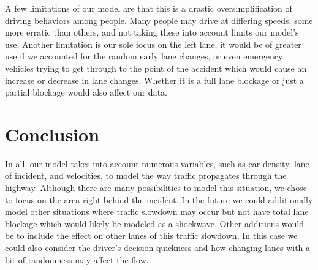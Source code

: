 \documentclass[10pt]{article}
\begin{document}
A few limitations of our model are that this is a drastic oversimplification of driving behaviors among people. Many people may drive at differing speeds, some more erratic than others, and not taking these into account limits our model’s use. Another limitation is our sole focus on the left lane, it would be of greater use if we accounted for the random early lane changes, or even emergency vehicles trying to get through to the point of the accident which would cause an increase or decrease in lane changes. Whether it is a full lane blockage or just a partial blockage would also affect our data.  

\section*{Conclusion}
In all, our model takes into account numerous variables, such as car density, lane of incident, and velocities, to model the way traffic propagates through the highway. Although there are many possibilities to model this situation, we chose to focus on the area right behind the incident. In the future we could additionally model other situations where traffic slowdown may occur but not have total lane blockage which would likely be modeled as a shockwave. Other additions would be to include the effect on other lanes of this traffic slowdown. In this case we could also consider the driver's decision quickness and how changing lanes with a bit of randomness may affect the flow. 
\end{document}
